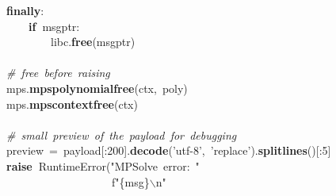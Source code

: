 \documentclass{article}\usepackage[]{graphicx}\usepackage[dvipsnames,table]{xcolor}
\makeatletter
\newcommand{\hlnum}[1]{\textcolor[rgb]{0.686,0.059,0.569}{#1}}%
\newcommand{\hlsng}[1]{\textcolor[rgb]{0.192,0.494,0.8}{#1}}%
\newcommand{\hlcom}[1]{\textcolor[rgb]{0.678,0.584,0.686}{\textit{#1}}}%
\newcommand{\hlopt}[1]{\textcolor[rgb]{0,0,0}{#1}}%
\newcommand{\hldef}[1]{\textcolor[rgb]{0.345,0.345,0.345}{#1}}%
\newcommand{\hlkwa}[1]{\textcolor[rgb]{0.161,0.373,0.58}{\textbf{#1}}}%
\newcommand{\hlkwb}[1]{\textcolor[rgb]{0.69,0.353,0.396}{#1}}%
\newcommand{\hlkwc}[1]{\textcolor[rgb]{0.333,0.667,0.333}{#1}}%
\newcommand{\hlkwd}[1]{\textcolor[rgb]{0.737,0.353,0.396}{\textbf{#1}}}%
\let\hlipl\hlkwb
\newenvironment{kframe}{%
 \def\at@end@of@kframe{}%
 \ifinner\ifhmode%
  \def\at@end@of@kframe{\end{minipage}}%
  \begin{minipage}{\columnwidth}%
 \fi\fi%
 \def\FrameCommand##1{\hskip\@totalleftmargin \hskip-\fboxsep
 \colorbox{shadecolor}{##1}\hskip-\fboxsep
     \hskip-\linewidth \hskip-\@totalleftmargin \hskip\columnwidth}%
 \MakeFramed {\advance\hsize-\width
   \@totalleftmargin\z@ \linewidth\hsize
   \@setminipage}}%
 {\par\unskip\endMakeFramed%
 \at@end@of@kframe}
\newenvironment{knitrout}{}{} %
\let\hlesc\hldef \let\hlpps\hldef \let\hllin\hldef \let\hlslc\hlcom \let\hlppc\hlcom
\makeatother
\begin{document}
\begin{center}
\begin{minipage}[m]{18cm}
\begin{knitrout}
\begin{kframe}
\hldef{}\hldef{\ \ \ \ \ \ \ \ }\hldef{}\hlkwa{finally}\hldef{}\hlopt{:}\hspace*{\fill}\\
\hldef{}\hldef{\ \ \ \ \ \ \ \ \ \ \ \ }\hldef{}\hlkwa{if\ }\hldef{msg\textunderscore ptr}\hlopt{:}\hspace*{\fill}\\
\hldef{}\hldef{\ \ \ \ \ \ \ \ \ \ \ \ \ \ \ \ }\hldef{\textunderscore libc}\hlopt{.}\hldef{}\hlkwd{free}\hldef{}\hlopt{(}\hldef{msg\textunderscore ptr}\hlopt{)}\hspace*{\fill}\\
\hldef{}\hspace*{\fill}\\
\hldef{}\hldef{\ \ \ \ \ \ \ \ }\hldef{}\hlslc{\#\ free\ before\ raising}\hspace*{\fill}\\
\hldef{}\hldef{\ \ \ \ \ \ \ \ }\hldef{\textunderscore mps}\hlopt{.}\hldef{}\hlkwd{mps\textunderscore polynomial\textunderscore free}\hldef{}\hlopt{(}\hldef{ctx}\hlopt{,\ }\hldef{poly}\hlopt{)}\hspace*{\fill}\\
\hldef{}\hldef{\ \ \ \ \ \ \ \ }\hldef{\textunderscore mps}\hlopt{.}\hldef{}\hlkwd{mps\textunderscore context\textunderscore free}\hldef{}\hlopt{(}\hldef{ctx}\hlopt{)}\hspace*{\fill}\\
\hldef{}\hspace*{\fill}\\
\hldef{}\hldef{\ \ \ \ \ \ \ \ }\hldef{}\hlslc{\#\ small\ preview\ of\ the\ payload\ for\ debugging}\hspace*{\fill}\\
\hldef{}\hldef{\ \ \ \ \ \ \ \ }\hldef{preview\ }\hlopt{=\ }\hldef{payload}\hlopt{{[}:}\hldef{}\hlnum{200}\hldef{}\hlopt{{]}.}\hldef{}\hlkwd{decode}\hldef{}\hlopt{(}\hldef{}\hlsng{'utf{-}8'}\hldef{}\hlopt{,\ }\hldef{}\hlsng{'replace'}\hldef{}\hlopt{).}\hldef{}\hlkwd{splitlines}\hldef{}\hlopt{(){[}:}\hldef{}\hlnum{5}\hldef{}\hlopt{{]}}\hspace*{\fill}\\
\hldef{}\hldef{\ \ \ \ \ \ \ \ }\hldef{}\hlkwa{raise\ }\hldef{}\hlkwc{RuntimeError}\hldef{}\hlopt{(}\hldef{}\hlsng{"MPSolve\ error:\ "}\hldef{}\hspace*{\fill}\\
\hldef{}\hldef{\ \ \ \ \ \ \ \ \ \ \ \ \ \ \ \ \ \ \ \ \ \ \ \ \ \ \ }\hldef{f}\hlsng{"}\hlipl{\{msg\}}\hlsng{}\hlesc{$\backslash$n}\hlsng{"}\hldef{}\hspace*{\fill}\\

\end{kframe}
\end{knitrout}
\end{minipage}
\end{center}
\end{document}
